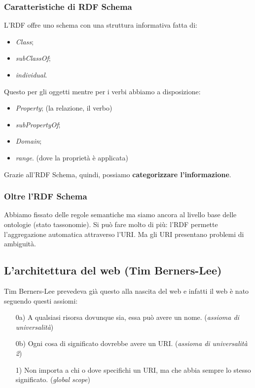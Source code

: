 			\subsubsection{Caratteristiche di RDF Schema}
				L'RDF offre uno schema con una struttura informativa fatta di:
				\begin{itemize}
					\item \emph{Class};
					\item \emph{subClassOf};
					\item \emph{individual}.
				\end{itemize}
				Questo per gli oggetti mentre per i verbi abbiamo a disposizione:
				\begin{itemize}
					\item \emph{Property}; (la relazione, il verbo)
					\item \emph{subPropertyOf};
					\item \emph{Domain};
					\item \emph{range}. (dove la proprietà è applicata)
				\end{itemize}
				Grazie all'RDF Schema, quindi, possiamo \textbf{categorizzare l'informazione}.

			\subsubsection{Oltre l'RDF Schema}
				Abbiamo fissato delle regole semantiche ma siamo ancora al livello base delle ontologie (stato tassonomie). Si può fare molto di più: l'RDF permette l'aggregazione automatica attraverso l'URI. Ma gli URI presentano problemi di ambiguità.
			
		\subsection{L'architettura del web (Tim Berners-Lee)}
			Tim Berners-Lee prevedeva già questo alla nascita del web e infatti il web è nato seguendo questi assiomi:
			\begin{itemize}
				\item [0a)] A qualsiasi risorsa dovunque sia, essa può avere un nome. (\emph{assioma di universalità})
				\item [0b)] Ogni cosa di significato dovrebbe avere un URI. (\emph{assioma di universalità 2})
				\item [1)] Non importa a chi o dove specifichi un URI, ma che abbia sempre lo stesso significato. (\emph{global scope})
			\end{itemize}
			
